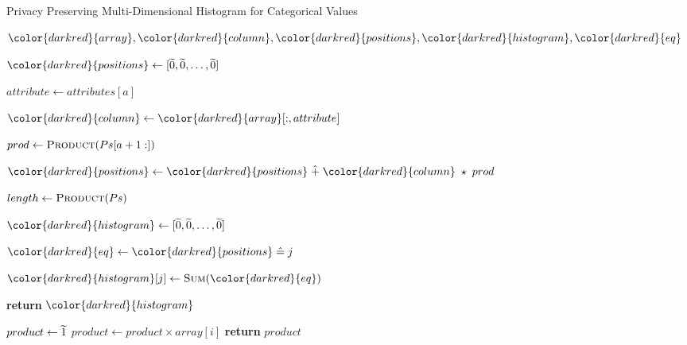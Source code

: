 \begin{algorithm}[H]
\caption{Privacy Preserving Multi-Dimensional Histogram for Categorical Values}\label{a:multidim-histogram-categorical}
\begin{algorithmic}[1]
\renewcommand{\algorithmicrequire}{\textbf{Private Vars:}}
\Require ${\color{darkred}{array}}, {\color{darkred}{column}}, {\color{darkred}{positions}}, {\color{darkred}{histogram}}, {\color{darkred}{eq}}$


    \State
    ${\color{darkred}{positions}} \gets [\enc{0}, \enc{0}, \dots, \enc{0}] $


      \State $attribute \gets attributes[a]$

      \State ${\color{darkred}{column}} \gets {\color{darkred}{array}}[:, attribute]$ 

      \State $prod \gets \textsc{Product}(Ps[a+1:])$ 

      \State ${\color{darkred}{positions}} \gets {\color{darkred}{positions}} \hplus {\color{darkred}{column}} \hmul prod$

    \EndFor

    \State $length \gets \textsc{Product}(Ps)$

    \State ${\color{darkred}{histogram}} \gets [\enc{0}, \enc{0}, \dots, \enc{0}]$



      \State ${\color{darkred}{eq}} \gets {\color{darkred}{positions}} \heq j$

      \State ${\color{darkred}{histogram}}[j] \gets \textsc{Sum}({\color{darkred}{eq}})$

    \EndFor

    \State \textbf{return} {${\color{darkred}{histogram}}$}
\EndProcedure

\begin{spacing}{0.5}
\end{spacing}

    \State $product \gets \widetilde{1}$
        \State $product \gets product \times array[i]$
    \EndFor
    \State \textbf{return} {$product$}
\EndProcedure

\end{algorithmic}
\end{algorithm}

